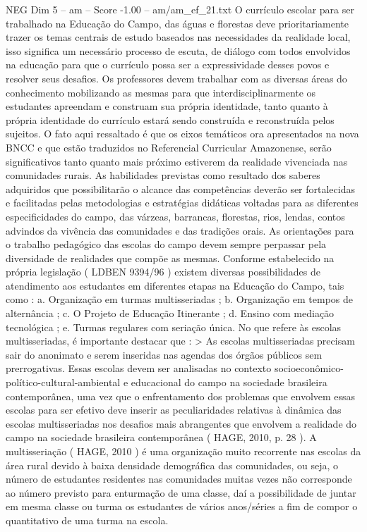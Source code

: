 \begin{textsample}{NEG Dim 5 – am – Score -1.00 – am/am\_ef\_21.txt}
O currículo escolar para ser trabalhado na Educação do Campo, das águas e florestas deve prioritariamente trazer os temas centrais de estudo baseados nas necessidades da realidade local, isso significa um necessário processo de escuta, de diálogo com todos envolvidos na educação para que o currículo possa ser a expressividade desses povos e resolver seus desafios.
Os professores devem trabalhar com as diversas áreas do conhecimento mobilizando as mesmas para que interdisciplinarmente os estudantes apreendam e construam sua própria identidade, tanto quanto à própria identidade do currículo estará sendo construída e reconstruída pelos sujeitos.
O fato aqui ressaltado é que os eixos temáticos ora apresentados na nova BNCC e que estão traduzidos no Referencial Curricular Amazonense, serão significativos tanto quanto mais próximo estiverem da realidade vivenciada nas comunidades rurais.
As habilidades previstas como resultado dos saberes adquiridos que possibilitarão o alcance das competências deverão ser fortalecidas e facilitadas pelas metodologias e estratégias didáticas voltadas para as diferentes especificidades do campo, das várzeas, barrancas, florestas, rios, lendas, contos advindos da vivência das comunidades e das tradições orais.
As orientações para o trabalho pedagógico das escolas do campo devem sempre perpassar pela diversidade de realidades que compõe as mesmas.
Conforme estabelecido na própria legislação ( LDBEN 9394/96 ) existem diversas possibilidades de atendimento aos estudantes em diferentes etapas na Educação do Campo, tais como : a.
Organização em turmas multisseriadas ; b.
Organização em tempos de alternância ; c.
O Projeto de Educação Itinerante ; d.
Ensino com mediação tecnológica ; e.
Turmas regulares com seriação única.
No que refere às escolas multisseriadas, é importante destacar que : > As escolas multisseriadas precisam sair do anonimato e serem inseridas nas agendas dos órgãos públicos sem prerrogativas.
Essas escolas devem ser analisadas no contexto socioeconômico-político-cultural-ambiental e educacional do campo na sociedade brasileira contemporânea, uma vez que o enfrentamento dos problemas que envolvem essas escolas para ser efetivo deve inserir as peculiaridades relativas à dinâmica das escolas multisseriadas nos desafios mais abrangentes que envolvem a realidade do campo na sociedade brasileira contemporânea ( HAGE, 2010, p. 28 ).
A multisseriação ( HAGE, 2010 ) é uma organização muito recorrente nas escolas da área rural devido à baixa densidade demográfica das comunidades, ou seja, o número de estudantes residentes nas comunidades muitas vezes não corresponde ao número previsto para enturmação de uma classe, daí a possibilidade de juntar em mesma classe ou turma os estudantes de vários anos/séries a fim de compor o quantitativo de uma turma na escola.

\end{textsample}
